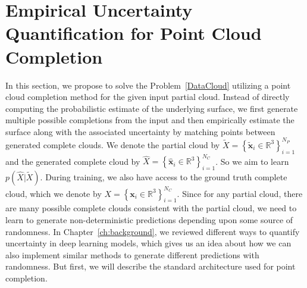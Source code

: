 \section{Empirical Uncertainty Quantification for Point Cloud Completion}
In this section, we propose to solve the Problem~\ref{DataCloud} utilizing a point cloud completion method for the given input partial cloud. Instead of directly computing the probabilistic estimate of the underlying surface, we first generate multiple possible completions from the input and then empirically estimate the surface along with the associated uncertainty by matching points between generated complete clouds. We denote the partial cloud by $\tilde{X}=\left\{\mathbf{\tilde{x}}_{i} \in \mathbb{R}^{3}\right\}_{i=1}^{N_P}$ and the generated complete cloud by $\hat{X}=\left\{\mathbf{\hat{x}}_{i} \in \mathbb{R}^{3}\right\}_{i=1}^{N_C}$. So we aim to learn $p(\hat{X}|\tilde{X})$. During training, we also have access to the ground truth complete cloud, which we denote by $X=\left\{\mathbf{x}_{i} \in \mathbb{R}^{3}\right\}_{i=1}^{N_C}$. Since for any partial cloud, there are many possible complete clouds consistent with the partial cloud, we need to learn to generate non-deterministic predictions depending upon some source of randomness. In Chapter~\ref{ch:background}, we reviewed different ways to quantify uncertainty in deep learning models, which gives us an idea about how we can also implement similar methods to generate different predictions with randomness. But first, we will describe the standard architecture used for point completion.


